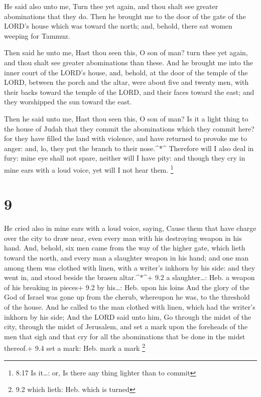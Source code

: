  He said also unto me, Turn thee yet again, and thou shalt
see greater abominations that they do.  Then he brought me
to the door of the gate of the LORD's house which was toward the north;
and, behold, there sat women weeping for Tammuz.

 Then said he unto me, Hast thou seen this, O son of man?
turn thee yet again, and thou shalt see greater abominations than these.
 And he brought me into the inner court of the LORD's
house, and, behold, at the door of the temple of the LORD, between the
porch and the altar, were about five and twenty men, with their backs
toward the temple of the LORD, and their faces toward the east; and they
worshipped the sun toward the east.

 Then he said unto me, Hast thou seen this, O son of man?
Is it a light thing to the house of Judah that they commit the
abominations which they commit here? for they have filled the land with
violence, and have returned to provoke me to anger: and, lo, they put
the branch to their nose.\^{}*\^{}  Therefore will I also
deal in fury: mine eye shall not spare, neither will I have pity: and
though they cry in mine ears with a loud voice, yet will I not hear
them. \footnote{8.17 Is it\ldots: or, Is there any thing lighter than to
  commit}

\hypertarget{section-8}{%
\section{9}\label{section-8}}

 He cried also in mine ears with a loud voice, saying, Cause
them that have charge over the city to draw near, even every man with
his destroying weapon in his hand.  And, behold, six men
came from the way of the higher gate, which lieth toward the north, and
every man a slaughter weapon in his hand; and one man among them was
clothed with linen, with a writer's inkhorn by his side: and they went
in, and stood beside the brasen altar.\^{}*\^{}+ 9.2 a slaughter\ldots:
Heb. a weapon of his breaking in pieces+ 9.2 by his\ldots: Heb. upon his
loins  And the glory of the God of Israel was gone up from
the cherub, whereupon he was, to the threshold of the house. And he
called to the man clothed with linen, which had the writer's inkhorn by
his side;  And the LORD said unto him, Go through the midst
of the city, through the midst of Jerusalem, and set a mark upon the
foreheads of the men that sigh and that cry for all the abominations
that be done in the midst thereof.+ 9.4 set a mark: Heb. mark a mark
\footnote{9.2 which lieth: Heb. which is turned}


